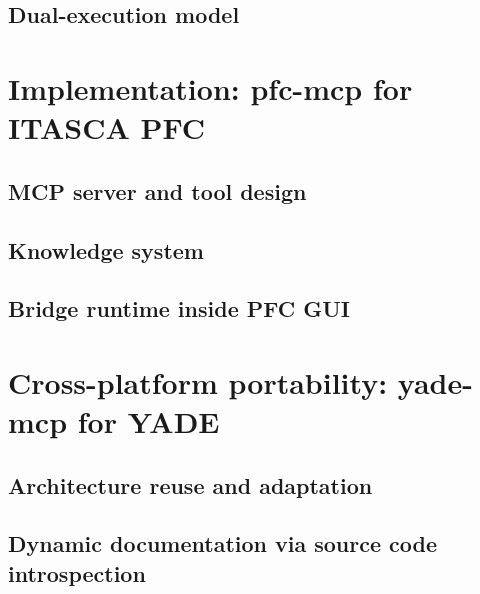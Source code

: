 \documentclass[../main]{subfiles}
\begin{document}
\subsection{Dual-execution model}
\label{subsec:ch3_execution}


\section{Implementation: pfc-mcp for ITASCA PFC}
\label{sec:ch3_pfcmcp}

\subsection{MCP server and tool design}
\label{subsec:ch3_pfc_tools}


\subsection{Knowledge system}
\label{subsec:ch3_pfc_knowledge}


\subsection{Bridge runtime inside PFC GUI}
\label{subsec:ch3_pfc_bridge}


\section{Cross-platform portability: yade-mcp for YADE}
\label{sec:ch3_yademcp}

\subsection{Architecture reuse and adaptation}
\label{subsec:ch3_yade_reuse}


\subsection{Dynamic documentation via source code introspection}
\label{subsec:ch3_yade_introspection}
\end{document}
